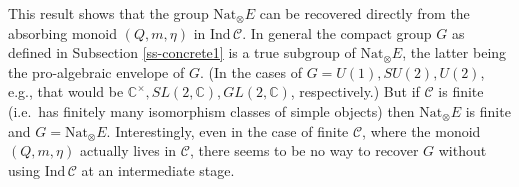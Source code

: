 \documentclass[12pt]{article}
\theoremstyle{definition}
\theoremstyle{definition}
\theoremstyle{remark}
\def\2#1{{\mathcal #1}}
\def\7#1{{\mathbb #1}}
\newcommand{\Nat}{\mathrm{Nat}}
\begin{document}
\brem This result shows that the group $\mathrm{Nat}_\otimes E$ can be
recovered directly from the absorbing monoid $(Q,m,\eta)$ in
$\mathrm{Ind}\,\2C$. In general the compact group $G$ as defined in
Subsection \ref{ss-concrete1} is a true subgroup of
$\mathrm{Nat}_\otimes E$, the latter being the pro-algebraic envelope
of $G$. (In the cases of $G=U(1), SU(2), U(2)$, e.g., that would be
$\7C^\times, SL(2,\7C), GL(2,\7C)$, respectively.) But if $\2C$ is
finite (i.e.\ has finitely many isomorphism classes of simple objects)
then $\Nat_\otimes E$ is finite and $G=\Nat_\otimes E$.
Interestingly, even in the case of finite $\2C$, where the monoid
$(Q,m,\eta)$ actually lives in $\2C$, there seems to be no way to
recover $G$ without using $\mathrm{Ind}\,\2C$ at an intermediate
stage.  \erem

 




\end{document}

